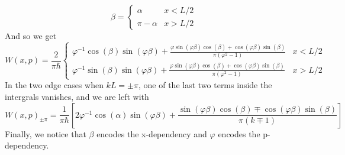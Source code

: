 \documentclass{article}
\begin{document}
\begin{equation}
    \beta = \begin{cases}
        \alpha & x < L/2 \\
        \pi - \alpha & x > L/2
    \end{cases}
\end{equation}
And so we get
\begin{equation}
    W(x,p) = \frac{2}{\pi \hbar} \begin{cases}
    \varphi^{-1}\cos(\beta)\sin(\varphi \beta)
    + \frac{\varphi\sin(\varphi \beta)\cos(\beta) + \cos(\varphi \beta)\sin(\beta)}
    {\pi\left(\varphi^2 - 1\right)} & x < L/2 \\
    \varphi^{-1}\sin(\beta)\sin(\varphi \beta)
    + \frac{\varphi\sin(\varphi \beta)\cos(\beta) + \cos(\varphi \beta)\sin(\beta)}
    {\pi\left(\varphi^2 - 1\right)} & x > L/2
    \end{cases}
\end{equation}
In the two edge cases when $kL = \pm\pi$, one of the last two terms inside the intergrals vanishes, and we are left with
\begin{equation}
    W(x, p)_{\pm \pi} = \frac{1}{\pi\hbar}\left[
    2\varphi^{-1}\cos(\alpha)\sin(\varphi \beta)
    + \frac{\sin(\varphi \beta)\cos(\beta) \mp \cos(\varphi\beta)\sin(\beta)}{\pi \left(k \mp 1\right)}
    \right]
\end{equation}
Finally, we notice that $\beta$ encodes the x-dependency and $\varphi$ encodes the p-dependency.
\end{document}

